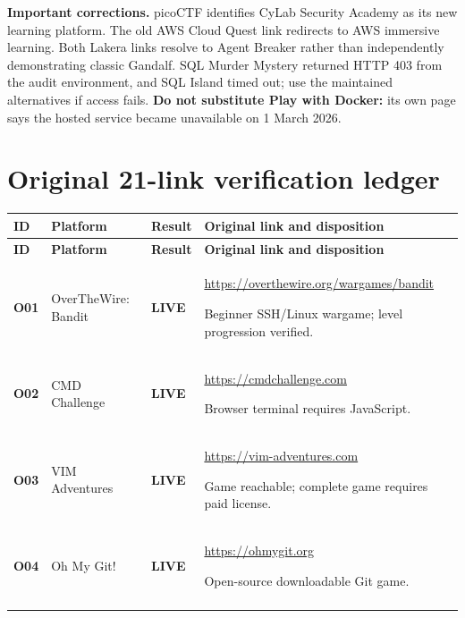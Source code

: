 \documentclass[10pt,letterpaper,oneside]{article}
\newcommand{\statuslive}{\textcolor{accent}{\textbf{LIVE}}}
\begin{document}
\begin{warningbox}
\textbf{Important corrections.} picoCTF identifies CyLab Security Academy as its new learning platform. The old AWS Cloud Quest link redirects to AWS immersive learning. Both Lakera links resolve to Agent Breaker rather than independently demonstrating classic Gandalf. SQL Murder Mystery returned HTTP 403 from the audit environment, and SQL Island timed out; use the maintained alternatives if access fails. \textbf{Do not substitute Play with Docker:} its own page says the hosted service became unavailable on 1 March 2026.
\end{warningbox}
\section{Original 21-link verification ledger}
\small
\begin{longtable}{@{}>{\raggedright\arraybackslash}p{\dimexpr 0.09551\dimexpr\linewidth-6\tabcolsep\relax\relax}>{\raggedright\arraybackslash}p{\dimexpr 0.23596\dimexpr\linewidth-6\tabcolsep\relax\relax}>{\raggedright\arraybackslash}p{\dimexpr 0.14607\dimexpr\linewidth-6\tabcolsep\relax\relax}>{\raggedright\arraybackslash}p{\dimexpr 0.52247\dimexpr\linewidth-6\tabcolsep\relax\relax}@{}}
\toprule
\textbf{ID} & \textbf{Platform} & \textbf{Result} & \textbf{Original link and disposition}\\\midrule
\endfirsthead
\toprule\textbf{ID}&\textbf{Platform}&\textbf{Result}&\textbf{Original link and disposition}\\\midrule\endhead
\bottomrule\endfoot
\textbf{O01} & OverTheWire: Bandit & \statuslive & \url{https://overthewire.org/wargames/bandit}\par \textcolor{mid}{Beginner SSH/Linux wargame; level progression verified.}\\
\addlinespace[3pt]
\textbf{O02} & CMD Challenge & \statuslive & \url{https://cmdchallenge.com}\par \textcolor{mid}{Browser terminal requires JavaScript.}\\
\addlinespace[3pt]
\textbf{O03} & VIM Adventures & \statuslive & \url{https://vim-adventures.com}\par \textcolor{mid}{Game reachable; complete game requires paid license.}\\
\addlinespace[3pt]
\textbf{O04} & Oh My Git! & \statuslive & \url{https://ohmygit.org}\par \textcolor{mid}{Open-source downloadable Git game.}\\
\addlinespace[3pt]

\end{longtable}
\end{document}
